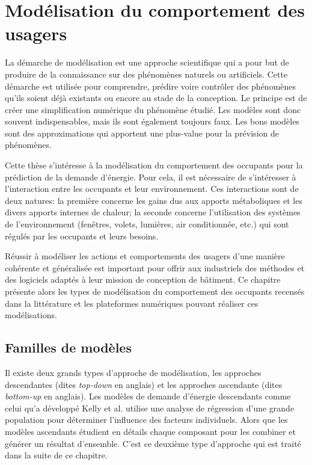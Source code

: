 \chapter{Modélisation du comportement des usagers}

La démarche de modélisation est une approche scientifique qui a pour but de produire de la connaissance sur des phénomènes naturels ou artificiels. Cette démarche est utilisée pour comprendre, prédire voire contrôler des phénomènes qu'ils soient déjà existants ou encore au stade de la conception. Le principe est de créer une simplification numérique du phénomène étudié. Les modèles sont donc souvent indispensables, mais ils sont également toujours faux. Les bons modèles sont des approximations qui apportent une plus-value pour la prévision de phénomènes.

Cette thèse s'intéresse à la modélisation du comportement des occupants pour la prédiction de la demande d'énergie. Pour cela, il est nécessaire de s'intéresser à l'interaction entre les occupants et leur environnement. Ces interactions sont de deux natures: la première concerne les gains dus aux apports métaboliques et les divers apports internes de chaleur; la seconde concerne l'utilisation des systèmes de l'environnement (fenêtres, volets, lumières, air conditionnée, etc.) qui sont régulés par les occupants et leurs besoins.

Réussir à modéliser les actions et comportements des usagers d'une manière cohérente et généralisée est important pour offrir aux industriels des méthodes et des logiciels adaptés à leur mission de conception de bâtiment. Ce chapitre présente alors les types de modélisation du comportement des occupants recensés dans la littérature et les plateformes numériques pouvant réaliser ces modélisations. 

\section{Familles de modèles}

Il existe deux grands types d'approche de modélisation, les approches descendantes (dites \textit{top-down} en anglais) et les approches ascendante (dites \textit{bottom-up} en anglais). Les modèles de demande d'énergie descendants comme celui qu'a développé Kelly et al. \cite{Kelly-13} utilise une analyse de régression d'une grande population pour déterminer l'influence des facteurs individuels. Alors que les modèles ascendants étudient en détails chaque composant pour les combiner et générer un résultat d'ensemble. C'est ce deuxième type d'approche qui est traité dans la suite de ce chapitre.

